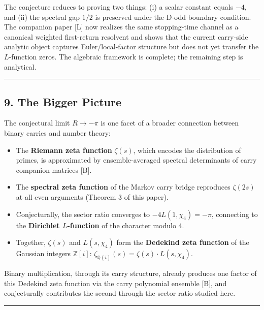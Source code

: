 \documentclass[
  11pt,
]{article}
\providecommand{\tightlist}{%
  \setlength{\itemsep}{0pt}\setlength{\parskip}{0pt}}
\begin{document}
The conjecture reduces to proving two things: (i) a scalar constant equals
\(-4\), and (ii) the spectral gap \(1/2\) is preserved under the D-odd boundary
condition. The companion paper {[}L{]} now realizes the same stopping-time
channel as a canonical weighted first-return resolvent and shows that the
current carry-side analytic object captures Euler/local-factor structure but
does not yet transfer the \(L\)-function zeros. The algebraic framework is
complete; the remaining step is analytical.

\begin{center}\rule{0.5\linewidth}{0.5pt}\end{center}

\newpage

\subsection{9. The Bigger Picture}\label{the-bigger-picture}

The conjectural limit \(R \to -\pi\) is one facet of a broader connection
between binary carries and number theory:

\begin{itemize}
\tightlist
\item
  The \textbf{Riemann zeta function} \(\zeta(s)\), which encodes the
  distribution of primes, is approximated by ensemble-averaged spectral
  determinants of carry companion matrices {[}B{]}.
\item
  The \textbf{spectral zeta function} of the Markov carry bridge reproduces
  \(\zeta(2s)\) at all even arguments (Theorem 3 of this paper).
\item
  Conjecturally, the sector ratio converges to \(-4L(1, \chi_4) = -\pi\),
  connecting to the \textbf{Dirichlet \(L\)-function} of the character modulo 4.
\item
  Together, \(\zeta(s)\) and \(L(s, \chi_4)\) form the \textbf{Dedekind zeta
  function} of the Gaussian integers \(\mathbb{Z}[i]\):
  \(\zeta_{\mathbb{Q}(i)}(s) = \zeta(s) \cdot L(s, \chi_4)\).
\end{itemize}

Binary multiplication, through its carry structure, already produces one factor
of this Dedekind zeta function via the carry polynomial ensemble {[}B{]}, and
conjecturally contributes the second through the sector ratio studied here.

\begin{center}\rule{0.5\linewidth}{0.5pt}\end{center}
\end{document}
